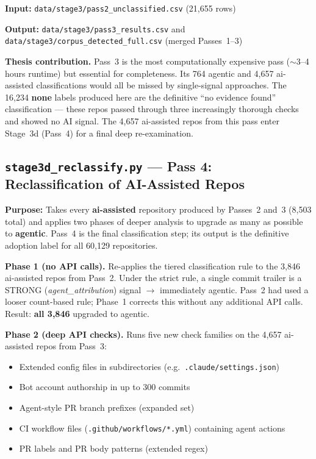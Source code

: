 \documentclass[11pt,a4paper]{article}
\begin{document}
\textbf{Input:} \texttt{data/stage3/pass2\_unclassified.csv} (21,655 rows)

\textbf{Output:} \texttt{data/stage3/pass3\_results.csv} and
\texttt{data/stage3/corpus\_detected\_full.csv} (merged Passes~1--3)

\begin{outputbox}
\textbf{Thesis contribution.}
Pass~3 is the most computationally expensive pass ($\sim$3--4 hours runtime)
but essential for completeness. Its 764 agentic and 4,657 ai-assisted
classifications would all be missed by single-signal approaches. The 16,234
\textbf{none} labels produced here are the definitive ``no evidence found''
classification --- these repos passed through three increasingly thorough
checks and showed no AI signal. The 4,657 ai-assisted repos from this pass
enter Stage~3d (Pass~4) for a final deep re-examination.
\end{outputbox}

\newpage

\subsection*{\texttt{stage3d\_reclassify.py} --- Pass 4: Reclassification of AI-Assisted Repos}

\begin{infobox}
\textbf{Purpose:} Takes every \textbf{ai-assisted} repository produced by
Passes~2 and~3 (8,503 total) and applies two phases of deeper analysis
to upgrade as many as possible to \textbf{agentic}. Pass~4 is the final
classification step; its output is the definitive adoption label for all
60,129 repositories.
\end{infobox}

\textbf{Phase 1 (no API calls).}
Re-applies the tiered classification rule to the 3,846 ai-assisted repos
from Pass~2. Under the strict rule, a single commit trailer is a STRONG
(\textit{agent\_attribution}) signal $\rightarrow$ immediately agentic.
Pass~2 had used a looser count-based rule; Phase~1 corrects this without
any additional API calls. Result: \textbf{all 3,846} upgraded to agentic.

\textbf{Phase 2 (deep API checks).}
Runs five new check families on the 4,657 ai-assisted repos from Pass~3:
\begin{itemize}
  \item Extended config files in subdirectories (e.g.\ \texttt{.claude/settings.json})
  \item Bot account authorship in up to 300 commits
  \item Agent-style PR branch prefixes (expanded set)
  \item CI workflow files (\texttt{.github/workflows/*.yml}) containing agent actions
  \item PR labels and PR body patterns (extended regex)
\end{itemize}
\end{document}
